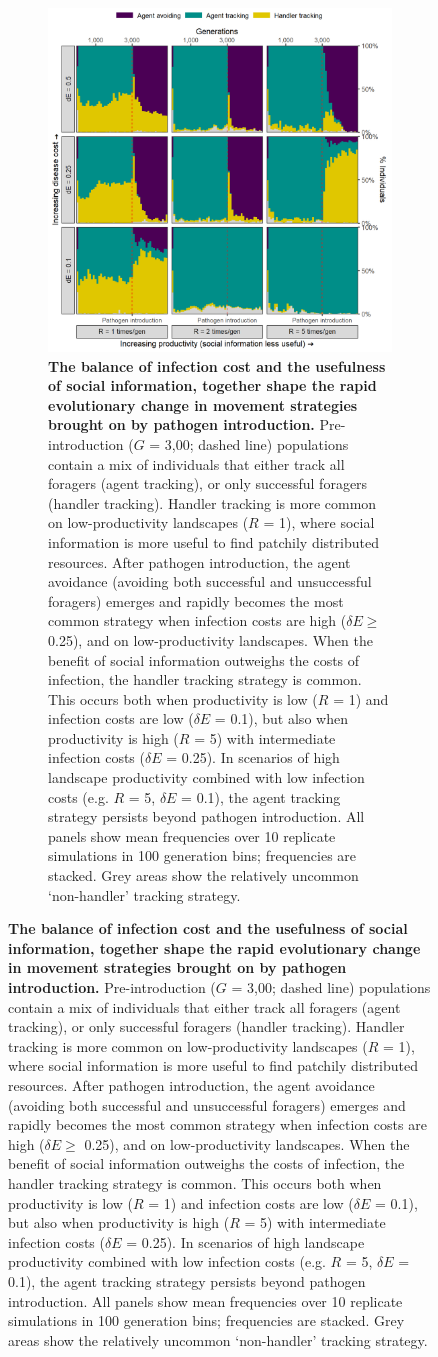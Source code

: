 \begin{figure}[!h]
\begin{figure}[!h]
    \centering
    \includegraphics[width=0.8\linewidth]{figures/pathomove/fig_05.png}
    \caption{
        \textbf{The balance of infection cost and the usefulness of social information, together shape the rapid evolutionary change in movement strategies brought on by pathogen introduction.}
        Pre-introduction ($G$ = 3,00; dashed line) populations contain a mix of individuals that either track all foragers (agent tracking), or only successful foragers (handler tracking).
        Handler tracking is more common on low-productivity landscapes ($R$ = 1), where social information is more useful to find patchily distributed resources.
        After pathogen introduction, the agent avoidance (avoiding both successful and unsuccessful foragers) emerges and rapidly becomes the most common strategy when infection costs are high ($\delta E \geq$ 0.25), and on low-productivity landscapes.
        When the benefit of social information outweighs the costs of infection, the handler tracking strategy is common.
        This occurs both when productivity is low ($R$ = 1) and infection costs are low ($\delta E$ = 0.1), but also when productivity is high ($R$ = 5) with intermediate infection costs ($\delta E$ = 0.25).
        In scenarios of high landscape productivity combined with low infection costs (e.g. $R$ = 5, $\delta E$ = 0.1), the agent tracking strategy persists beyond pathogen introduction.
        All panels show mean frequencies over 10 replicate simulations in 100 generation bins; frequencies are stacked.
        Grey areas show the relatively uncommon `non-handler' tracking strategy.
    }\label{patho_fig_05}
\end{figure}


\end{figure}
